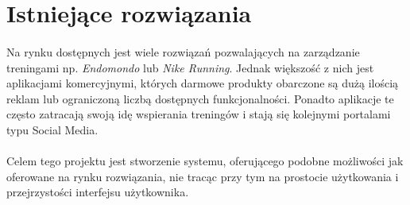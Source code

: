 \section{Istniejące rozwiązania}
\paragraph{}
Na rynku dostępnych jest wiele rozwiązań pozwalających na zarządzanie treningami np. \textit{Endomondo} lub \textit{Nike Running}. Jednak większość z nich jest aplikacjami komercyjnymi, których darmowe produkty obarczone są dużą ilością reklam lub ograniczoną liczbą dostępnych funkcjonalności. Ponadto aplikacje te często zatracają swoją idę wspierania treningów i stają się kolejnymi portalami typu Social Media. 
\paragraph{} %
\label{par:}

Celem tego projektu jest stworzenie systemu, oferującego podobne możliwości jak oferowane na rynku rozwiązania, nie tracąc przy tym na prostocie użytkowania i przejrzystości interfejsu użytkownika.
